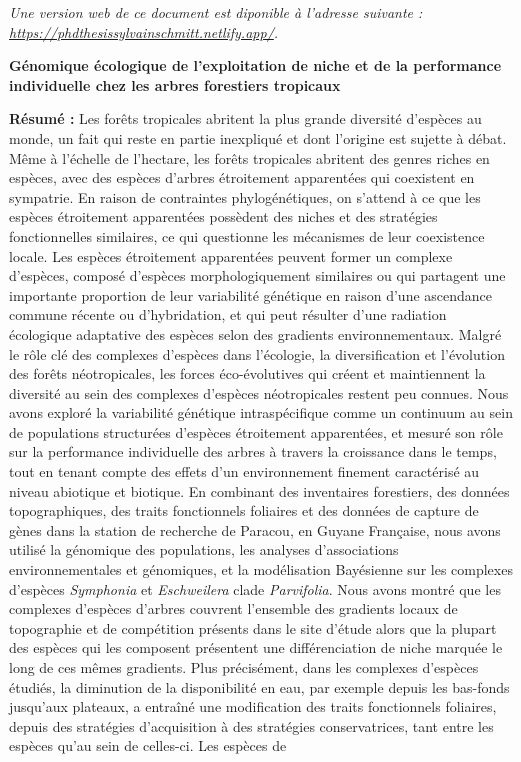 \newpage
\vspace*{\fill}
\emph{Une version web de ce document est diponible à l'adresse suivante : \url{https://phdthesissylvainschmitt.netlify.app/}.}
\newpage
{\fontsize{7}{8}\selectfont
\begin{center}
\textbf{Génomique écologique de l'exploitation de niche et de la performance individuelle chez les arbres forestiers tropicaux} \\
\end{center} 
\textbf{Résumé :}
Les forêts tropicales abritent la plus grande diversité d'espèces au monde, un fait qui reste en partie inexpliqué et dont l'origine est sujette à débat. Même à l'échelle de l'hectare, les forêts tropicales abritent des genres riches en espèces, avec des espèces d’arbres étroitement apparentées qui coexistent en sympatrie. En raison de contraintes phylogénétiques, on s'attend à ce que les espèces étroitement apparentées possèdent des niches et des stratégies fonctionnelles similaires, ce qui questionne les mécanismes de leur coexistence locale. Les espèces étroitement apparentées peuvent former un complexe d'espèces, composé d’espèces morphologiquement similaires ou qui partagent une importante proportion de leur variabilité génétique en raison d'une ascendance commune récente ou d'hybridation, et qui peut résulter d'une radiation écologique adaptative des espèces selon des gradients environnementaux. Malgré le rôle clé des complexes d'espèces dans l'écologie, la diversification et l'évolution des forêts néotropicales, les forces éco-évolutives qui créent et maintiennent la diversité au sein des complexes d'espèces néotropicales restent peu connues. Nous avons exploré la variabilité génétique intraspécifique comme un continuum au sein de populations structurées d'espèces étroitement apparentées, et mesuré son rôle sur la performance individuelle des arbres à travers la croissance dans le temps, tout en tenant compte des effets d'un environnement finement caractérisé au niveau abiotique et biotique. En combinant des inventaires forestiers, des données topographiques, des traits fonctionnels foliaires et des données de capture de gènes dans la station de recherche de Paracou, en Guyane Française, nous avons utilisé la génomique des populations, les analyses d'associations environnementales et génomiques, et la modélisation Bayésienne sur les complexes d'espèces \emph{Symphonia} et \emph{Eschweilera} clade \emph{Parvifolia}. Nous avons montré que les complexes d'espèces d'arbres couvrent l’ensemble des gradients locaux de topographie et de compétition présents dans le site d'étude alors que la plupart des espèces qui les composent présentent une différenciation de niche marquée le long de ces mêmes gradients. Plus précisément, dans les complexes d'espèces étudiés, la diminution de la disponibilité en eau, par exemple depuis les bas-fonds jusqu’aux plateaux, a entraîné une modification des traits fonctionnels foliaires, depuis des stratégies d'acquisition à des stratégies conservatrices, tant entre les espèces qu'au sein de celles-ci. Les espèces de }
